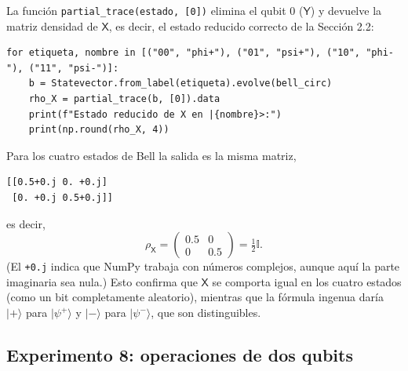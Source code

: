 \documentclass[11pt, a4paper, twoside, openright]{report}
\begin{document}
\noindent La función \texttt{partial\_trace(estado, [0])} elimina el qubit 0 ($\mathsf{Y}$) y devuelve la matriz densidad de $\mathsf{X}$, es decir, el estado reducido correcto de la Sección 2.2:
\begin{lstlisting}
for etiqueta, nombre in [("00", "phi+"), ("01", "psi+"), ("10", "phi-"), ("11", "psi-")]:
    b = Statevector.from_label(etiqueta).evolve(bell_circ)
    rho_X = partial_trace(b, [0]).data
    print(f"Estado reducido de X en |{nombre}>:")
    print(np.round(rho_X, 4))
\end{lstlisting}
\noindent Para los cuatro estados de Bell la salida es la misma matriz,
\begin{lstlisting}[language={}]
[[0.5+0.j 0. +0.j]
 [0. +0.j 0.5+0.j]]
\end{lstlisting}
\noindent es decir,
\[ \rho_{\mathsf{X}} = \begin{pmatrix} 0.5 & 0 \\ 0 & 0.5\end{pmatrix} = \tfrac12\mathbb{I}. \]
(El \texttt{+0.j} indica que NumPy trabaja con números complejos, aunque aquí la parte imaginaria sea nula.) Esto confirma que $\mathsf{X}$ se comporta igual en los cuatro estados (como un bit completamente aleatorio), mientras que la fórmula ingenua daría $|+\rangle$ para $|\psi^+\rangle$ y $|-\rangle$ para $|\psi^-\rangle$, que son distinguibles.

\subsection{Experimento 8: operaciones de dos qubits}
\end{document}
